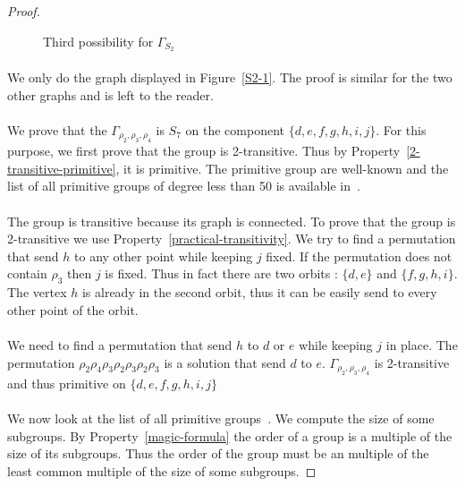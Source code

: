 \begin{proof}
\begin{figure}[H]
\begin{center}
\begin{tikzpicture}[scale=.8]
      \end{tikzpicture}
      \caption{Third possibility for $\Gamma_{S_2}$}
    \end{center}
  \end{figure}

  \paragraph{}
  We only do the graph displayed in Figure~\ref{S2-1}. The proof is similar for the two other graphs and is left to the reader.

  \paragraph{}
  We prove that the $\Gamma_{\rho_2,\rho_3,\rho_4}$ is $S_7$ on the component $\{d,e,f,g,h,i,j\}$. For this purpose, we first prove that the group is 2-transitive. Thus by Property~\ref{2-transitive-primitive}, it is primitive. The primitive group are well-known and the list of all primitive groups of degree less than 50 is available in~\cite{buekenhout1996list}.

  \paragraph{}
  The group is transitive because its graph is connected. To prove that the group is 2-transitive we use Property~\ref{practical-transitivity}. We try to find a permutation that send $h$ to any other point while keeping $j$ fixed. If the permutation does not contain $\rho_3$ then $j$ is fixed. Thus in fact there are two orbits : $\{d,e\}$ and $\{f,g,h,i\}$. The vertex $h$ is already in the second orbit, thus it can be easily send to every other point of the orbit.

  \paragraph{}
  We need to find a permutation that send $h$ to $d$ or $e$ while keeping $j$ in place. The permutation $\rho_2 \rho_4 \rho_3 \rho_2 \rho_3 \rho_2 \rho_3$ is a solution that send $d$ to $e$. $\Gamma_{\rho_2, \rho_3, \rho_4}$ is 2-transitive and thus primitive on $\{d,e,f,g,h,i,j\}$

  \paragraph{}
  We now look at the list of all primitive groups~\cite{buekenhout1996list}. We compute the size of some subgroups. By Property~\ref{magic-formula} the order of a group is a multiple of the size of its subgroups. Thus the order of the group must be an multiple of the least common multiple of the size of some subgroups.


\end{proof}
